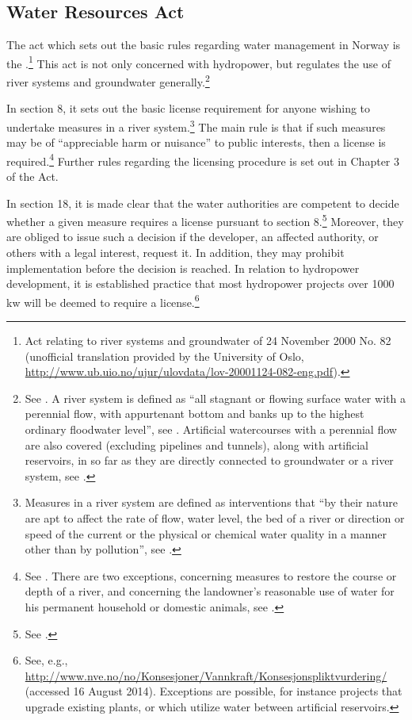 \subsection{Water Resources Act}

The act which sets out the basic rules regarding water management in Norway is the \cite{wra00}.\footnote{Act relating to river systems and groundwater of 24 November 2000 No. 82 (unofficial translation provided by the University of Oslo, \url{http://www.ub.uio.no/ujur/ulovdata/lov-20001124-082-eng.pdf}).} This act is not only concerned with hydropower, but regulates the use of river systems and groundwater generally.\footnote{See \cite[1]{wra00}. A river system is defined as ``all stagnant or flowing surface water with a perennial flow, with appurtenant bottom and banks up to the highest ordinary floodwater level'', see \cite[2]{wra00}. Artificial watercourses with a perennial flow are also covered (excluding pipelines and tunnels), along with artificial reservoirs, in so far as they are directly connected to groundwater or a river system, see \cite[2a-2b]{wra00}.} 

In section 8, it sets out the basic license requirement for anyone wishing to undertake measures in a river system.\footnote{Measures in a river system are defined as interventions that ``by their nature are apt to affect the rate of flow, water level, the bed of a river or direction or speed of the current or the physical or chemical water quality in a manner other than by pollution'', see \cite[3a]{wra00}.} The main rule is that if such measures may be of ``appreciable harm or nuisance''  to public interests, then a license is required.\footnote{See \cite[8]{wra00}. There are two exceptions, concerning measures to restore the course or depth of a river, and concerning the landowner's reasonable use of water for his permanent household or domestic animals, see \cite[12|15]{wra00}.} Further rules regarding the licensing procedure is set out in Chapter 3 of the Act.

In section 18, it is made clear that the water authorities are competent to decide whether a given measure requires a license pursuant to section 8.\footnote{See \cite[18]{wra00}.}  Moreover, they are obliged to issue such a decision if the developer, an affected authority, or others with a legal interest, request it. In addition, they may prohibit implementation before the decision is reached. In relation to hydropower development, it is established practice that most hydropower projects over 1000 kw will be deemed to require a license.\footnote{See, e.g., \url{http://www.nve.no/no/Konsesjoner/Vannkraft/Konsesjonspliktvurdering/} (accessed 16 August 2014). Exceptions are possible, for instance projects that upgrade existing plants, or which utilize water between artificial reservoirs.}

